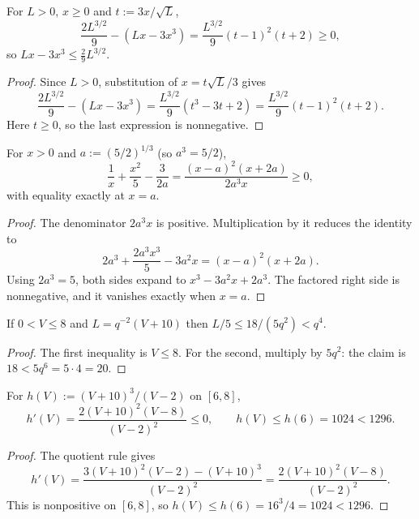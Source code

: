 \begin{lemma}\label{lem:ledger-cubic}
For $L>0$, $x\ge0$ and $t:=3x/\sqrt L$,
\begin{equation}\label{eq:ledger-cubic}
  \frac{2L^{3/2}}9-(Lx-3x^3)=\frac{L^{3/2}}9(t-1)^2(t+2)\ge0 ,
\end{equation}
so $Lx-3x^3\le\tfrac29L^{3/2}$.
\end{lemma}

\begin{proof}
Since $L>0$, substitution of $x=t\sqrt L/3$ gives
\[
  \frac{2L^{3/2}}9-(Lx-3x^3)
  =\frac{L^{3/2}}9(t^3-3t+2)
  =\frac{L^{3/2}}9(t-1)^2(t+2).
\]
Here $t\ge0$, so the last expression is nonnegative.
\end{proof}

\begin{lemma}\label{lem:ledger-binding}
For $x>0$ and $a:=(5/2)^{1/3}$ (so $a^3=5/2$),
\begin{equation}\label{eq:ledger-binding}
  \frac1x+\frac{x^2}{5}-\frac{3}{2a}
  =\frac{(x-a)^2(x+2a)}{2a^3x}\ge0 ,
\end{equation}
with equality exactly at $x=a$.
\end{lemma}

\begin{proof}
The denominator $2a^3x$ is positive.  Multiplication by it reduces the
identity to
\[
  2a^3+\frac{2a^3x^3}{5}-3a^2x=(x-a)^2(x+2a).
\]
Using $2a^3=5$, both sides expand to $x^3-3a^2x+2a^3$.
The factored right side is nonnegative, and it vanishes exactly when $x=a$.
\end{proof}

\begin{lemma}\label{lem:ledger-L5}
If $0<V\le8$ and $L=q^{-2}(V+10)$ then $L/5\le18/(5q^2)<q^4$.
\end{lemma}

\begin{proof}
The first inequality is $V\le8$.  For the second, multiply by $5q^2$: the
claim is $18<5q^6=5\cdot4=20$.
\end{proof}

\begin{lemma}[Monotonicity of $h$]\label{lem:ledger-h}
For $h(V):=(V+10)^3/(V-2)$ on $[6,8]$,
\begin{equation}\label{eq:ledger-h}
  h'(V)=\frac{2(V+10)^2(V-8)}{(V-2)^2}\le0,
  \qquad
  h(V)\le h(6)=1024<1296 .
\end{equation}
\end{lemma}

\begin{proof}
The quotient rule gives
\[
 h'(V)=\frac{3(V+10)^2(V-2)-(V+10)^3}{(V-2)^2}
      =\frac{2(V+10)^2(V-8)}{(V-2)^2}.
\]
This is nonpositive on $[6,8]$, so $h(V)\le h(6)=16^3/4=1024<1296$.
\end{proof}

